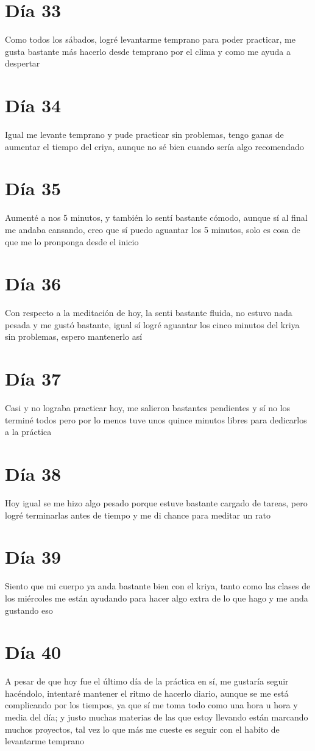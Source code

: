 \documentclass[11pt]{report}
\theoremstyle{plain}
\theoremstyle{definition}
\begin{document}
\section*{Día 33}%
	Como todos los sábados, logré levantarme temprano para poder practicar, me gusta bastante más hacerlo desde temprano por el clima y como me ayuda a despertar
\section*{Día 34}
	Igual me levante temprano y pude practicar sin problemas, tengo ganas de aumentar el tiempo del criya, aunque no sé bien cuando sería algo recomendado
\section*{Día 35}
	Aumenté a nos 5 minutos, y también lo sentí bastante cómodo, aunque sí al final me andaba cansando, creo que sí puedo aguantar los 5 minutos, solo es cosa de que me lo pronponga desde el inicio
\section*{Día 36}
	Con respecto a la meditación de hoy, la senti bastante fluida, no estuvo nada pesada y me gustó bastante, igual sí logré aguantar los cinco minutos del kriya sin problemas, espero mantenerlo así
\section*{Día 37}
	Casi y no lograba practicar hoy, me salieron bastantes pendientes y sí no los terminé todos pero por lo menos tuve unos quince minutos libres para dedicarlos a la práctica
\section*{Día 38}
	Hoy igual se me hizo algo pesado porque estuve bastante cargado de tareas, pero logré terminarlas antes de tiempo y me di chance para meditar un rato
\section*{Día 39}
	Siento que mi cuerpo ya anda bastante bien con el kriya, tanto como las clases de los miércoles me están ayudando para hacer algo extra de lo que hago y me anda gustando eso
\section*{Día 40} %
	A pesar de que hoy fue el último día de la práctica en sí, me gustaría seguir hacéndolo, intentaré mantener el ritmo de hacerlo diario, aunque se me está complicando por los tiempos, ya que sí me toma todo como una hora u hora y media del día; y justo muchas materias de las que estoy llevando están marcando muchos proyectos, tal vez lo que más me cueste es seguir con el habito de levantarme temprano
\end{document}
